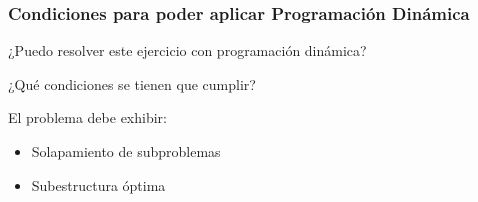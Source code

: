 \documentclass[spanish]{beamer}
\begin{document}
    \begin{frame}
        \frametitle{Condiciones para poder aplicar Programación Dinámica}

        \begin{center}
            ¿Puedo resolver este ejercicio con programación dinámica?

            \pause

            \vspace{1em}
            ¿Qué condiciones se tienen que cumplir?
        \end{center}

        \pause

        \vspace{1em}
        El problema debe exhibir:

        \begin{itemize}
            \item<4-> Solapamiento de subproblemas
            \item<5-> Subestructura óptima
        \end{itemize}
    \end{frame}
\end{document}
